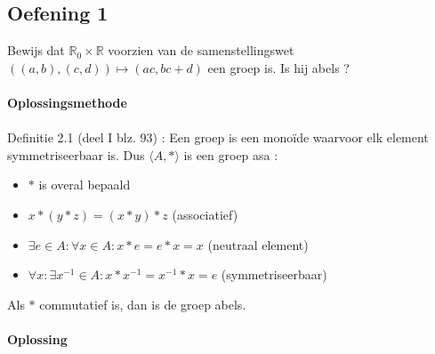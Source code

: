 \documentclass[11pt,a4paper,titlepage]{article}
\begin{document}
\subsection{Oefening 1}
Bewijs dat $\mathbb{R}_0 \times \mathbb{R}$ voorzien van de samenstellingswet $((a,b),(c,d)) \mapsto (ac,bc+d)$ een groep is. Is hij abels ? \\ \\
\textbf{Oplossingsmethode} \\ \\
Definitie 2.1 (deel I blz. 93) : Een groep is een monoïde waarvoor elk element symmetriseerbaar is. Dus $\langle A, * \rangle$ is een groep asa :
	\begin{itemize}
		\item $*$ is overal bepaald
		\item $x*(y*z) = (x*y)*z$ \quad (associatief)
		\item $\exists e \in A : \forall x \in A : x*e = e*x = x$ \quad (neutraal element)
		\item $\forall x : \exists x^{-1} \in A : x*x^{-1} = x^{-1}*x =e$ \quad (symmetriseerbaar)
	\end{itemize}
Als $*$ commutatief is, dan is de groep abels. \\ \\
\textbf{Oplossing} \\ 
\end{document}
